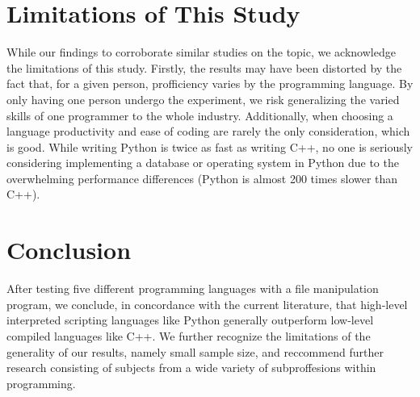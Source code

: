\documentclass{article}
\begin{document}
\section{Limitations of This Study}

While our findings to corroborate similar studies on the topic, we acknowledge the limitations of this study. Firstly, the results may have been distorted by the fact that, for a given person, profficiency varies by the programming language. By only having one person undergo the experiment, we risk generalizing the varied skills of one programmer to the whole industry. Additionally, when choosing a language productivity and ease of coding are rarely the only consideration, which is good. While writing Python is twice as fast as writing C++, no one is seriously considering implementing a database or operating system in Python due to the overwhelming performance differences (Python is almost 200 times slower than C++).

\section{Conclusion}

After testing five different programming languages with a file manipulation program, we conclude, in concordance with the current literature, that high-level interpreted scripting languages like Python generally outperform low-level compiled languages like C++. We further recognize the limitations of the generality of our results, namely small sample size, and reccommend further research consisting of subjects from a wide variety of subproffesions within programming.

\printbibliography
\end{document}
